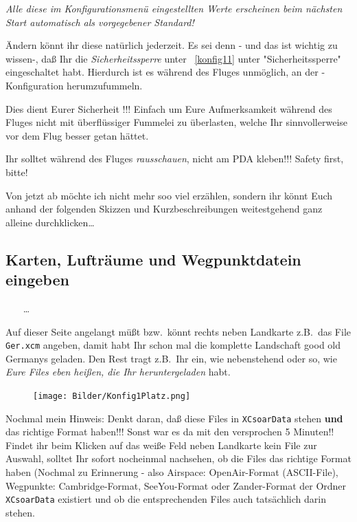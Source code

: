 \merkes\textit{Alle diese im Konfigurationsmenü eingestellten Werte erscheinen beim nächsten Start automatisch als vorgegebener Standard!}

 Ändern könnt ihr diese natürlich jederzeit. Es sei denn - und das ist wichtig zu wissen-, daß Ihr die \textit{Sicherheitssperre}  unter ~\ref{konfig11} unter "Sicherheitssperre"  eingeschaltet habt.
 Hierdurch ist es während des Fluges unmöglich, an der \xc -Konfiguration herumzufummeln.

 Dies dient Eurer Sicherheit !!! Einfach um Eure Aufmerksamkeit  während des Fluges nicht mit überflüssiger Fummelei  zu überlasten, welche Ihr sinnvollerweise vor dem Flug besser getan hättet.

 Ihr solltet während des Fluges \textit{rausschauen}, nicht am PDA kleben!!! Safety first, bitte!

Von jetzt ab möchte ich nicht mehr soo viel erzählen, sondern ihr könnt Euch anhand der folgenden Skizzen und  Kurzbeschreibungen weitestgehend ganz alleine durchklicken\dots

\subsection{Karten, Lufträume und Wegpunktdatein eingeben}\label{fileseingeben}
\begin{center} \bblitz
{}\blink~\blink~\blink~ \far \far \dots \qquad {}
\end{center}

Auf dieser Seite angelangt müßt bzw.\ könnt rechts neben \textsf{Landkarte} z.B.\ das File \texttt{Ger.xcm} angeben, damit habt Ihr schon mal die komplette Landschaft good old Germanys geladen. Den Rest tragt z.B.\ Ihr ein, wie nebenstehend oder so, wie \textsl{Eure Files eben heißen, die Ihr heruntergeladen} habt.


\begin{figure}
\texttt{[image: Bilder/Konfig1Platz.png]}
\end{figure}
Nochmal mein Hinweis: Denkt daran, daß diese Files in \texttt{XCsoarData} stehen \textbf{und} das richtige Format haben!!! Sonst war es da mit den versprochen 5 Minuten!!\\

 Findet ihr beim Klicken auf das weiße Feld neben \textsf{Landkarte} kein File zur Auswahl, solltet Ihr sofort nocheinmal nachsehen, ob die Files das richtige Format haben (Nochmal zu Erinnerung - also Airspace: OpenAir-Format (ASCII-File), Wegpunkte: Cambridge-Format, SeeYou-Format oder Zander-Format der Ordner \texttt{XCsoar\-Data} existiert und ob die entsprechenden Files auch tatsächlich darin stehen. \\

